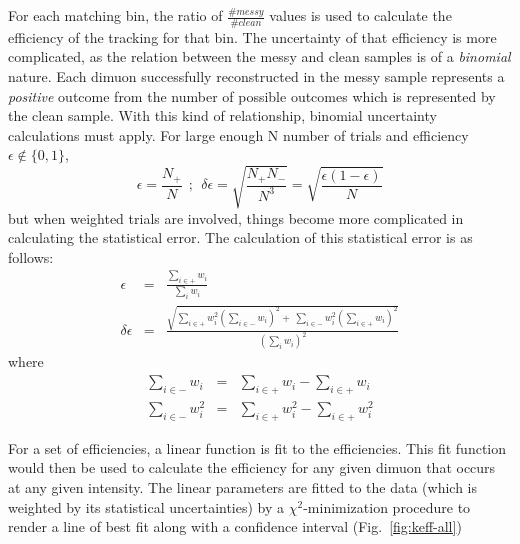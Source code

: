 For each matching bin, the ratio of $\frac{\#messy}{\#clean}$ values is used to calculate the efficiency of the tracking for that bin. The uncertainty of that efficiency is more complicated, as the relation between the messy and clean samples is of a \emph{binomial} nature. Each dimuon successfully reconstructed in the messy sample represents a \emph{positive} outcome from the number of possible outcomes which is represented by the clean sample. With this kind of relationship, binomial uncertainty calculations must apply. For large enough N number of trials and efficiency $\epsilon\notin \{0,1\}$,
\begin{equation}
\epsilon = \frac{N_+}{N}\ \ ;\ \ \delta\epsilon = \sqrt{\frac{N_+ N_-}{N^3}} = \sqrt{\frac{\epsilon(1-\epsilon)}{N}}
\label{eq:binomial-naive}
\end{equation}
but when weighted trials are involved, things become more complicated in calculating the statistical error. The calculation of this statistical error\cite{blist:binomial} is as follows:
\begin{eqnarray}
	\epsilon & = & \frac{\sum\limits_{i\in+}w_i}{\sum\limits_i w_i} \\
	\delta\epsilon & = & \frac{\sqrt{\sum\limits_{i\in+} w_i^2 \left(\sum\limits_{i\in-} w_i \right)^2 + \
			\sum\limits_{i\in-} w_i^2 \left(\sum\limits_{i\in+} w_i \right)^2}} {\left(\sum\limits_{i}w_i\right)^2}
	\label{eq:binomial-weighted}
\end{eqnarray}
where
\begin{eqnarray}
\sum\limits_{i\in-} w_i & = & \sum\limits_{i\in+}w_i - \sum\limits_{i\in+}w_i \\
\sum\limits_{i\in-} w_i^2 & = & \sum\limits_{i\in+}w_i^2 - \sum\limits_{i\in+}w_i^2 
\end{eqnarray}

For a set of efficiencies, a linear function is fit to the efficiencies. This fit function would then be used to calculate the efficiency for any given dimuon that occurs at any given intensity. The linear parameters are fitted to the data (which is weighted by its statistical uncertainties) by a $\chi^2$-minimization procedure to render a line of best fit along with a confidence interval (Fig.~\ref{fig:keff-all})


